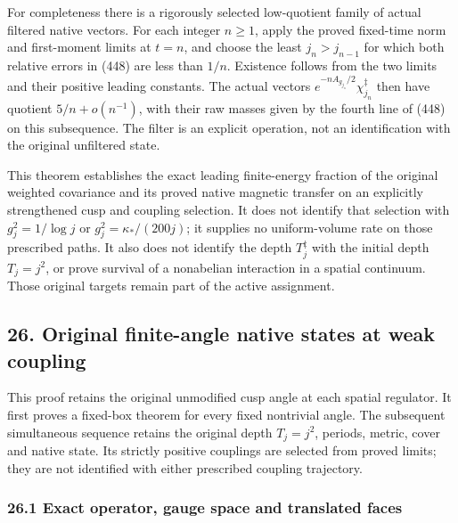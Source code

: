 \documentclass[
  11pt,
]{article}
\begin{document}
For completeness there is a rigorously selected low-quotient family of
actual filtered native vectors. For each integer \(n\ge1\), apply the
proved fixed-time norm and first-moment limits at \(t=n\), and choose
the least \(j_n>j_{n-1}\) for which both relative errors in (448) are
less than \(1/n\). Existence follows from the two limits and their
positive leading constants. The actual vectors
\(e^{-nA_{g_{j_n}}/2}\chi_{j_n}^\ddagger\) then have quotient
\(5/n+o(n^{-1})\), with their raw masses given by the fourth line of
(448) on this subsequence. The filter is an explicit operation, not an
identification with the original unfiltered state.

This theorem establishes the exact leading finite-energy fraction of the
original weighted covariance and its proved native magnetic transfer on
an explicitly strengthened cusp and coupling selection. It does not
identify that selection with \(g_j^2=1/\log j\) or
\(g_j^2=\kappa_*/(200j)\); it supplies no uniform-volume rate on those
prescribed paths. It also does not identify the depth \(T_j^\ddagger\)
with the initial depth \(T_j=j^2\), or prove survival of a nonabelian
interaction in a spatial continuum. Those original targets remain part
of the active assignment.

\subsection{26. Original finite-angle native states at weak
coupling}\label{original-finite-angle-native-states-at-weak-coupling}

This proof retains the original unmodified cusp angle at each spatial
regulator. It first proves a fixed-box theorem for every fixed
nontrivial angle. The subsequent simultaneous sequence retains the
original depth \(T_j=j^2\), periods, metric, cover and native state. Its
strictly positive couplings are selected from proved limits; they are
not identified with either prescribed coupling trajectory.

\subsubsection{26.1 Exact operator, gauge space and translated
faces}\label{exact-operator-gauge-space-and-translated-faces}
\end{document}
